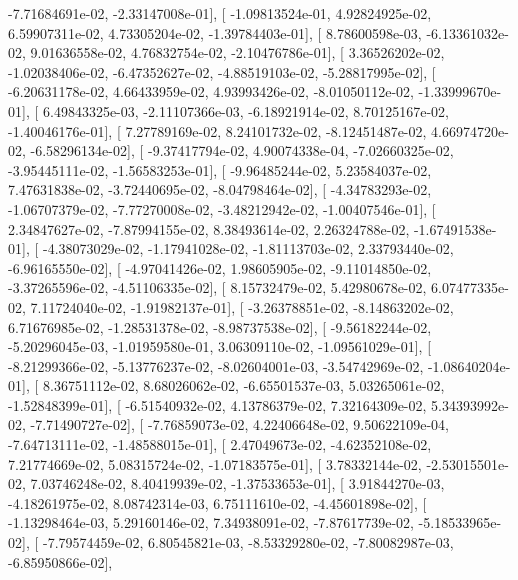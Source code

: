 \documentclass{article}
\begin{document}
         -7.71684691e-02,  -2.33147008e-01],
       [ -1.09813524e-01,   4.92824925e-02,   6.59907311e-02,
          4.73305204e-02,  -1.39784403e-01],
       [  8.78600598e-03,  -6.13361032e-02,   9.01636558e-02,
          4.76832754e-02,  -2.10476786e-01],
       [  3.36526202e-02,  -1.02038406e-02,  -6.47352627e-02,
         -4.88519103e-02,  -5.28817995e-02],
       [ -6.20631178e-02,   4.66433959e-02,   4.93993426e-02,
         -8.01050112e-02,  -1.33999670e-01],
       [  6.49843325e-03,  -2.11107366e-03,  -6.18921914e-02,
          8.70125167e-02,  -1.40046176e-01],
       [  7.27789169e-02,   8.24101732e-02,  -8.12451487e-02,
          4.66974720e-02,  -6.58296134e-02],
       [ -9.37417794e-02,   4.90074338e-04,  -7.02660325e-02,
         -3.95445111e-02,  -1.56583253e-01],
       [ -9.96485244e-02,   5.23584037e-02,   7.47631838e-02,
         -3.72440695e-02,  -8.04798464e-02],
       [ -4.34783293e-02,  -1.06707379e-02,  -7.77270008e-02,
         -3.48212942e-02,  -1.00407546e-01],
       [  2.34847627e-02,  -7.87994155e-02,   8.38493614e-02,
          2.26324788e-02,  -1.67491538e-01],
       [ -4.38073029e-02,  -1.17941028e-02,  -1.81113703e-02,
          2.33793440e-02,  -6.96165550e-02],
       [ -4.97041426e-02,   1.98605905e-02,  -9.11014850e-02,
         -3.37265596e-02,  -4.51106335e-02],
       [  8.15732479e-02,   5.42980678e-02,   6.07477335e-02,
          7.11724040e-02,  -1.91982137e-01],
       [ -3.26378851e-02,  -8.14863202e-02,   6.71676985e-02,
         -1.28531378e-02,  -8.98737538e-02],
       [ -9.56182244e-02,  -5.20296045e-03,  -1.01959580e-01,
          3.06309110e-02,  -1.09561029e-01],
       [ -8.21299366e-02,  -5.13776237e-02,  -8.02604001e-03,
         -3.54742969e-02,  -1.08640204e-01],
       [  8.36751112e-02,   8.68026062e-02,  -6.65501537e-03,
          5.03265061e-02,  -1.52848399e-01],
       [ -6.51540932e-02,   4.13786379e-02,   7.32164309e-02,
          5.34393992e-02,  -7.71490727e-02],
       [ -7.76859073e-02,   4.22406648e-02,   9.50622109e-04,
         -7.64713111e-02,  -1.48588015e-01],
       [  2.47049673e-02,  -4.62352108e-02,   7.21774669e-02,
          5.08315724e-02,  -1.07183575e-01],
       [  3.78332144e-02,  -2.53015501e-02,   7.03746248e-02,
          8.40419939e-02,  -1.37533653e-01],
       [  3.91844270e-03,  -4.18261975e-02,   8.08742314e-03,
          6.75111610e-02,  -4.45601898e-02],
       [ -1.13298464e-03,   5.29160146e-02,   7.34938091e-02,
         -7.87617739e-02,  -5.18533965e-02],
       [ -7.79574459e-02,   6.80545821e-03,  -8.53329280e-02,
         -7.80082987e-03,  -6.85950866e-02],
\end{document}
